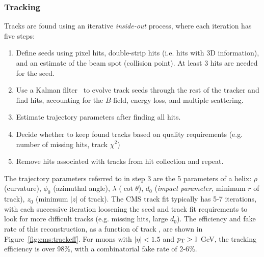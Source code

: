 \subsubsection{Tracking}

Tracks are found using an iterative \emph{inside-out} process, where each iteration has five steps:
\begin{enumerate}
    \item Define seeds using pixel hits, double-strip hits (i.e. hits with 3D information), and an estimate of the beam spot (collision point). At least 3 hits are needed for the seed.
    \item Use a Kalman filter~\cite{kalman2,kalman1} to evolve track seeds through the rest of the tracker and find hits, accounting for the $B$-field, energy loss, and multiple scattering.
    \item Estimate trajectory parameters after finding all hits.
    \item Decide whether to keep found tracks based on quality requirements (e.g. number of missing hits, track $\chi^2$)
    \item Remove hits associated with tracks from hit collection and repeat.
\end{enumerate}
The trajectory parameters referred to in step 3 are the 5 parameters of a helix: $\rho$ (curvature), $\phi_0$ (azimuthal angle), $\lambda$ ($\cot\theta$), $d_0$ (\emph{impact parameter}, minimum $r$ of track), $z_0$ (minimum $|z|$ of track).
The CMS track fit typically has 5-7 iterations, with each successive iteration loosening the seed and track fit requirements to look for more difficult tracks (e.g. missing hits, large $d_0$).
The efficiency and fake rate of this reconstruction, as a function of track \pt, are shown in Figure~\ref{fig:cms:trackeff}.
For muons with $|\eta|<1.5$ and $p_\mathrm{T}>1$ GeV, the tracking efficiency is over 98\%, with a combinatorial fake rate of 2-6\%. 

